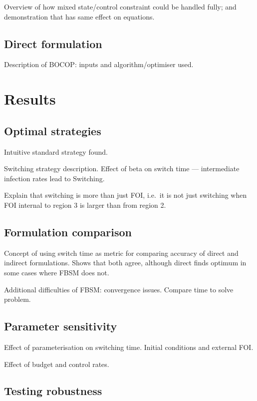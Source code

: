 Overview of how mixed state/control constraint could be handled fully; and demonstration that has same effect on equations.

\subsection{Direct formulation}

Description of BOCOP: inputs and algorithm/optimiser used.

\section{Results}

\subsection{Optimal strategies}

Intuitive standard strategy found.

Switching strategy description. Effect of beta on switch time --- intermediate infection rates lead to Switching.

Explain that switching is more than just FOI, i.e.\ it is not just switching when FOI internal to region 3 is larger than from region 2.

\subsection{Formulation comparison}

Concept of using switch time as metric for comparing accuracy of direct and indirect formulations. Shows that both agree, although direct finds optimum in some cases where FBSM does not.

Additional difficulties of FBSM: convergence issues. Compare time to solve problem.

\subsection{Parameter sensitivity}

Effect of parameterisation on switching time. Initial conditions and external FOI.

Effect of budget and control rates.

\subsection{Testing robustness}

